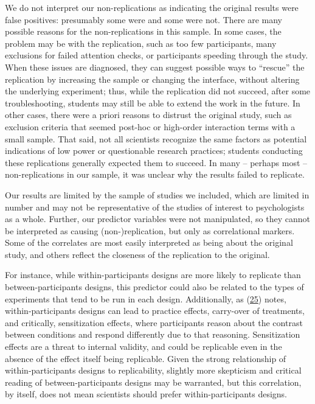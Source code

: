 \documentclass[
  english,
  a4paper,
]{article}
\begin{document}
We do not interpret our non-replications as indicating the original results were false positives: presumably some were and some were not. There are many possible reasons for the non-replications in this sample. In some cases, the problem may be with the replication, such as too few participants, many exclusions for failed attention checks, or participants speeding through the study. When these issues are diagnosed, they can suggest possible ways to ``rescue'' the replication by increasing the sample or changing the interface, without altering the underlying experiment; thus, while the replication did not succeed, after some troubleshooting, students may still be able to extend the work in the future. In other cases, there were a priori reasons to distrust the original study, such as exclusion criteria that seemed post-hoc or high-order interaction terms with a small sample. That said, not all scientists recognize the same factors as potential indications of low power or questionable research practices; students conducting these replications generally expected them to succeed. In many -- perhaps most -- non-replications in our sample, it was unclear why the results failed to replicate.

Our results are limited by the sample of studies we included, which are limited in number and may not be representative of the studies of interest to psychologists as a whole. Further, our predictor variables were not manipulated, so they cannot be interpreted as causing (non-)replication, but only as correlational markers. Some of the correlates are most easily interpreted as being about the original study, and others reflect the closeness of the replication to the original.

For instance, while within-participants designs are more likely to replicate than between-participants designs, this predictor could also be related to the types of experiments that tend to be run in each design. Additionally, as (\protect\hyperlink{ref-greenwald1976}{25}) notes, within-participants designs can lead to practice effects, carry-over of treatments, and critically, sensitization effects, where participants reason about the contrast between conditions and respond differently due to that reasoning. Sensitization effects are a threat to internal validity, and could be replicable even in the absence of the effect itself being replicable. Given the strong relationship of within-participants designs to replicability, slightly more skepticism and critical reading of between-participants designs may be warranted, but this correlation, by itself, does not mean scientists should prefer within-participants designs.
\end{document}
